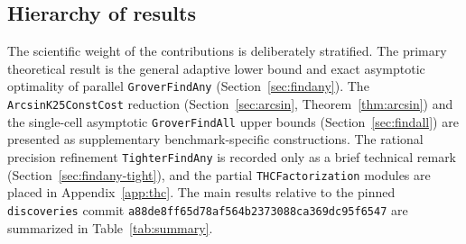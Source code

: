 \documentclass[11pt,a4paper]{article}
\theoremstyle{definition}
\theoremstyle{remark}
\begin{document}
\subsection{Hierarchy of results}

The scientific weight of the contributions is deliberately stratified. The primary theoretical result is the general adaptive lower bound and exact asymptotic optimality of parallel \texttt{GroverFindAny} (Section~\ref{sec:findany}). The \texttt{ArcsinK25\allowbreak ConstCost} reduction (Section~\ref{sec:arcsin}, Theorem~\ref{thm:arcsin}) and the single-cell asymptotic \texttt{GroverFindAll} upper bounds (Section~\ref{sec:findall}) are presented as supplementary benchmark-specific constructions. The rational precision refinement \texttt{Tighter\allowbreak FindAny} is recorded only as a brief technical remark (Section~\ref{sec:findany-tight}), and the partial \texttt{THC\allowbreak Factorization} modules are placed in Appendix~\ref{app:thc}. The main results relative to the pinned \texttt{discoveries} commit \texttt{a88de8ff\allowbreak 65d78af5\allowbreak 64b23730\allowbreak 88ca369d\allowbreak c95f6547} are summarized in Table~\ref{tab:summary}.
\end{document}
